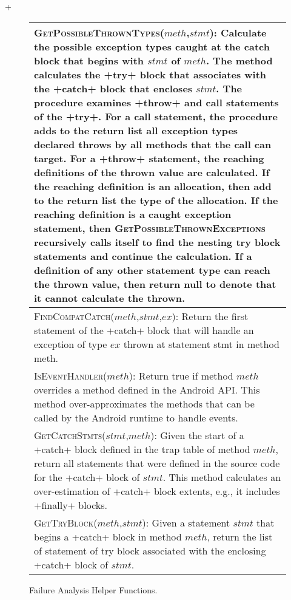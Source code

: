 \lstMakeShortInline[basicstyle=\scriptsize\ttfamily,keywordstyle=\color{DarkPurple},breaklines=true]+

\begin{figure}[t]
\scriptsize
\renewcommand*{\arraystretch}{1.3}
\begin{tabular}{|p{3.3in}|}
\hline 

\textsc{GetPossibleThrownTypes}($meth$,$stmt$): Calculate the
possible exception types caught at the catch block that begins with
$stmt$ of $meth$. The method calculates the
+try+ block that associates with the +catch+ block
that encloses $stmt$. The procedure examines +throw+
and call statements of the +try+.  For a call statement, the
procedure adds to the return list all exception types declared throws
by all methods that the call can target.  For a +throw+
statement, the reaching definitions of the thrown value are
calculated.  If the reaching definition is an allocation, then add to
the return list the type of the allocation.  If the reaching
definition is a caught exception statement, then
\textsc{GetPossibleThrownExceptions} recursively calls itself to find
the nesting try block statements and continue the calculation.  If a
definition of any other statement type can reach the thrown value,
then return null to denote that it cannot calculate the
thrown.  
\\
\hline
\textsc{FindCompatCatch}($meth$,$stmt$,$ex$): Return the first
  statement of the +catch+ block that will handle an
  exception of type $ex$ thrown at statement stmt in method meth.
\\
\hline
\textsc{IsEventHandler}($meth$): Return true if method $meth$
  overrides a method defined in the Android API.  This method
  over-approximates the methods that can be called by the Android
  runtime to handle events.
\\
\hline
\textsc{GetCatchStmts}($stmt$,$meth$): Given the start of a
+catch+ block defined in the trap table of method $meth$,
return all statements that were defined in the source code for the
+catch+ block of $stmt$.  This method calculates an
over-estimation of +catch+ block extents, e.g., it includes
+finally+ blocks.
\\
\hline
\textsc{GetTryBlock}($meth$,$stmt$): Given a statement $stmt$
  that begins a +catch+ block in method $meth$, return the
  list of statement of try block associated with the enclosing
  +catch+ block of $stmt$.
\\
\hline
\end{tabular}
\caption{\label{fig:helper-funs}Failure Analysis Helper Functions.}
\vspace{-0.1in}
\end{figure}

